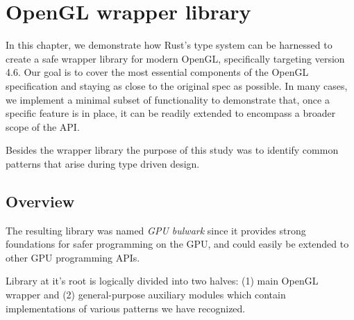 \chapter{OpenGL wrapper library}

In this chapter, we demonstrate how Rust's type system can be harnessed to create a safe wrapper library for modern OpenGL, specifically targeting version 4.6. Our goal is to cover the most essential components of the OpenGL specification and staying as close to the original spec as possible. 
In many cases, we implement a minimal subset of functionality to demonstrate that, once a specific feature is in place, it can be readily extended to encompass a broader scope of the API.

Besides the wrapper library the purpose of this study was to identify common patterns that arise during type driven design.

\section*{Overview}

The resulting library was named \textit{GPU bulwark} since it provides strong foundations for safer programming on the GPU, and could easily be extended to other GPU programming APIs.

Library at it's root is logically divided into two halves: (1) main OpenGL wrapper and (2) general-purpose auxiliary modules which contain implementations of various patterns we have recognized.
%
